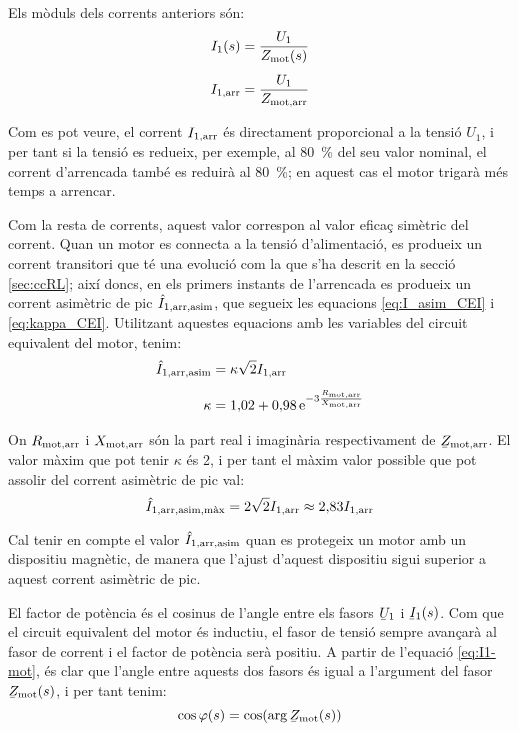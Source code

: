 Els mòduls dels corrents anteriors són:
\begin{subequations}
\begin{align}
    I_1(s) &= \frac{U_1}{Z_\mathrm{mot}(s)} \label{eq:mot-I1}\\[1ex]
    I_\mathrm{1,arr} &= \frac{U_1}{Z_\mathrm{mot,arr}}\label{eq:mot-Iarr}
\end{align}
\end{subequations}

Com es pot veure, el corrent $I_\mathrm{1,arr}$ és directament proporcional a la tensió $U_1$, i per tant si la tensió es redueix, per exemple, al \qty{80}{\%} del seu valor nominal, el corrent d'arrencada també es reduirà al \qty{80}{\%}; en aquest cas el motor trigarà més temps a arrencar.

Com la resta de corrents, aquest valor correspon al valor eficaç simètric del corrent. Quan un motor es connecta a la tensió d'alimentació, es produeix un corrent transitori que té una evolució com la que s'ha descrit en la secció \vref{sec:ccRL}; així doncs, en els primers instants de l'arrencada es produeix un corrent asimètric de pic $\hat{I}_\mathrm{1,arr,asim}$, que segueix les equacions \eqref{eq:I_asim_CEI} i \eqref{eq:kappa_CEI}. Utilitzant aquestes equacions amb les variables del circuit equivalent del motor, tenim:
\begin{subequations}
\begin{align}
    \hat{I}_\mathrm{1,arr,asim} &= \kappa \sqrt{2} I_\mathrm{1,arr}  \\[1ex]
    \kappa &= 1{,}02 + 0{,}98 \,\mathrm{e}^{-3\frac{R_\mathrm{mot,arr}}{X_\mathrm{mot,arr}}}
\end{align}
\end{subequations}

On $R_\mathrm{mot,arr}$ i $X_\mathrm{mot,arr}$ són la part real i imaginària respectivament de $\cmplx{Z}\ped{mot,arr}$. El valor màxim que pot tenir  $\kappa$ és 2, i per tant el màxim valor possible que pot assolir del corrent asimètric de pic val:
\begin{equation}
	\hat{I}_\mathrm{1,arr,asim,\text{màx}} =  2\sqrt{2} I_\mathrm{1,arr} \approx 2{,}83 I_\mathrm{1,arr} 
\end{equation}

Cal tenir en compte el valor $\hat{I}_\mathrm{1,arr,asim}$ quan es protegeix un motor amb un dispositiu magnètic, de manera que l'ajust d'aquest dispositiu sigui superior a aquest corrent asimètric de  pic.

El factor de potència és el cosinus de l'angle entre els fasors $\cmplx{U}_1$ i $\cmplx{I}_1(s)$. Com que el circuit equivalent del motor és inductiu, el fasor de tensió sempre avançarà al fasor de corrent i el factor de potència serà positiu. A partir de l'equació \eqref{eq:I1-mot}, és clar que l'angle entre aquests dos fasors és igual a l'argument del fasor $\cmplx{Z}\ped{mot}(s)$, i per tant tenim:
\begin{equation}\index{motors d'inducció!factor de potència}
	\cos\varphi(s) = \cos(\arg\cmplx{Z}\ped{mot}(s))\label{eq:cos-fi-mot}
\end{equation}

